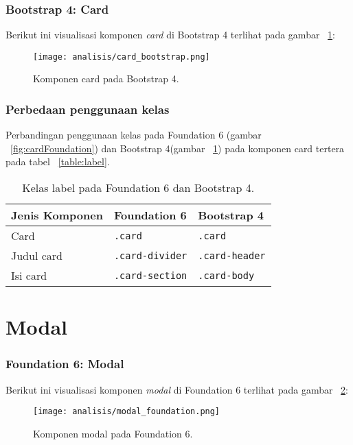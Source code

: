 \subsubsection{Bootstrap 4: Card}
Berikut ini visualisasi komponen \textit{card} di Bootstrap 4 terlihat pada gambar ~\ref{fig:cardBootstrap}:
\begin{figure} [H]
	\centering
	\texttt{[image: analisis/card\_bootstrap.png]}
	\caption{Komponen card pada Bootstrap 4.}
	\label{fig:cardBootstrap}
\end{figure}

\subsubsection{Perbedaan penggunaan kelas}
\noindent Perbandingan penggunaan kelas pada Foundation 6 (gambar ~\ref{fig:cardFoundation}) dan Bootstrap 4(gambar ~\ref{fig:cardBootstrap}) pada komponen card tertera pada tabel ~\ref{table:label}.\\

\begin{table}[H] 
	\caption{Kelas label pada Foundation 6 dan Bootstrap 4.}
	\begin{tabular}{| p{} | p{} | p{} |} 
		\hline
		\textbf{Jenis Komponen} & \textbf{Foundation 6} & \textbf{Bootstrap 4}  \\ [0.5ex] 
		\hline	
		Card & \texttt{.card} & \texttt{.card}\\ 
		\hline
		Judul card & \texttt{.card-divider} & \texttt{.card-header}\\ 
		\hline
		Isi card & \texttt{.card-section} & \texttt{.card-body}\\ [1ex]
		\hline
	\end{tabular}
	\label{table:card}
\end{table}

\section{Modal}
\subsubsection{Foundation 6: Modal}
Berikut ini visualisasi komponen \textit{modal} di Foundation 6 terlihat pada gambar ~\ref{fig:modalFoundation}:
\begin{figure} [H]	
	\centering
	\texttt{[image: analisis/modal\_foundation.png]}
	\caption{Komponen modal pada Foundation 6.}
	\label{fig:modalFoundation}
\end{figure}

